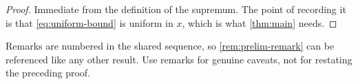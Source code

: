 \begin{proof}
Immediate from the definition of the supremum. The point of recording
it is that \cref{eq:uniform-bound} is uniform in $x$, which is what
\cref{thm:main} needs.
\end{proof}

\begin{remark}
\label{rem:prelim-remark}
Remarks are numbered in the shared sequence, so \cref{rem:prelim-remark}
can be referenced like any other result. Use remarks for genuine
caveats, not for restating the preceding proof.
\end{remark}
